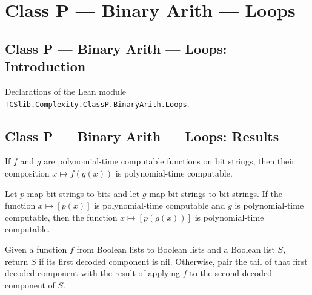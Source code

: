 \section{Class P --- Binary Arith --- Loops}
\subsection*{Class P --- Binary Arith --- Loops: Introduction}

Declarations of the Lean module \texttt{TCSlib.Complexity.ClassP.BinaryArith.Loops}.

\subsection*{Class P --- Binary Arith --- Loops: Results}

\begin{theorem}
\label{Complexity.BinArith.polyTimeComputable_app}
\leanok
{}
If $f$ and $g$ are polynomial-time computable functions on bit strings, then their
composition $x\mapsto f(g(x))$ is polynomial-time computable.
\end{theorem}

\begin{theorem}
\label{Complexity.BinArith.polyTimeComputable_test_app}
\leanok
{}
Let $p$ map bit strings to bits and let $g$ map bit strings to bit strings. If the
function $x\mapsto [p(x)]$ is polynomial-time computable and $g$ is polynomial-time
computable, then the function $x\mapsto [p(g(x))]$ is polynomial-time computable.
\end{theorem}

\begin{definition}
\label{Complexity.BinArith.forStep}
\leanok
{}
Given a function $f$ from Boolean lists to Boolean lists and a Boolean list $S$, return
$S$ if its first decoded component is nil. Otherwise, pair the tail of that first
decoded component with the result of applying $f$ to the second decoded component of
$S$.
\end{definition}

